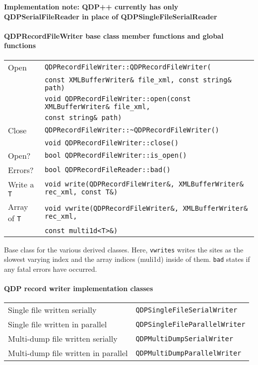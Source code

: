 \documentclass[12pt,letterpaper]{article}
\begin{document}
{\bf Implementation note: QDP++ currently has only QDPSerialFileReader in place
of QDPSingleFileSerialReader}

\paragraph{QDPRecordFileWriter base class member functions and global functions}


\begin{flushleft}
  \begin{tabular}{|l|l|}
  \hline
  Open           & \verb|QDPRecordFileWriter::QDPRecordFileWriter(|\\
                 & \qquad\verb|const XMLBufferWriter& file_xml, const string& path)|\\
                 & \verb|void QDPRecordFileWriter::open(const XMLBufferWriter& file_xml, |\\
                 & \qquad\verb|const string& path)|\\
  \hline
  Close          & \verb|QDPRecordFileWriter::~QDPRecordFileWriter()|\\
                 & \verb|void QDPRecordFileWriter::close()|\\
  \hline
  Open?          & \verb|bool QDPRecordFileWriter::is_open()| \\
  \hline
  Errors?        & \verb|bool QDPRecordFileReader::bad()| \\
  \hline
  Write a \verb|T| & \verb|void write(QDPRecordFileWriter&, XMLBufferWriter& rec_xml, const T&)| \\
  Array of \verb|T| & \verb|void vwrite(QDPRecordFileWriter&, XMLBufferWriter& rec_xml, |\\
                 & \qquad\verb|const multi1d<T>&)| \\
  \hline
 \end{tabular}
\end{flushleft}
%
Base class for the various derived classes. Here, \verb|vwrites|
writes the sites as the slowest varying index and the array indices
(muli1d) inside of them. \verb|bad| states if any fatal errors have
occurred.

\paragraph{QDP record writer implementation classes}

\begin{flushleft}
  \begin{tabular}{|l|l|}
  \hline
  Single file written serially & \verb|QDPSingleFileSerialWriter| \\
  Single file written in parallel & \verb|QDPSingleFileParallelWriter| \\
  \hline
  Multi-dump file written serially & \verb|QDPMultiDumpSerialWriter| \\
  Multi-dump file written in parallel & \verb|QDPMultiDumpParallelWriter| \\
  \hline
 \end{tabular}
\end{flushleft}
\end{document}

